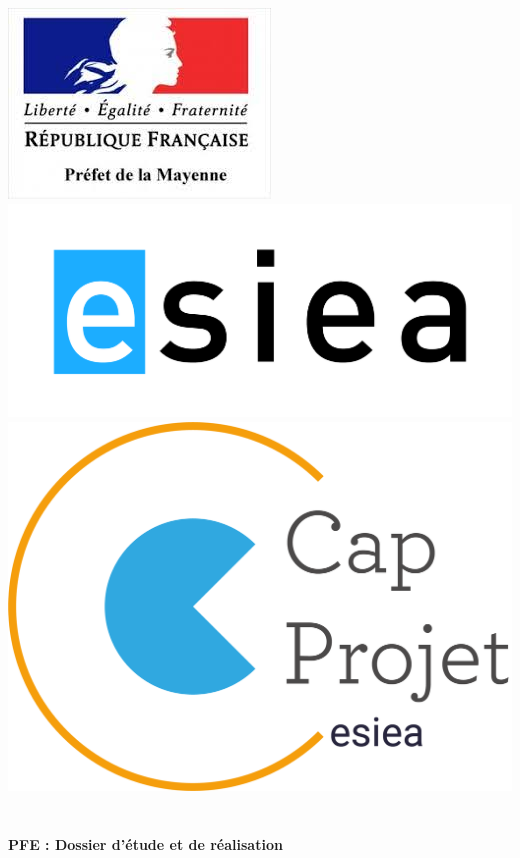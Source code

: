 \begin{titlepage}
\begin{center}

\includegraphics [scale=0.45] {images/logoPref.jpeg} \includegraphics [scale=0.35] {images/ESIEA.JPG} \includegraphics [scale=0.2] {images/capProjet.png} ~\\[1.5cm] 

\textsc {\LARGE }\\[5cm]

{ \LARGE \bfseries PFE : Dossier d'étude et de réalisation\\[0.4cm] }


\end{center}
\end{titlepage}
